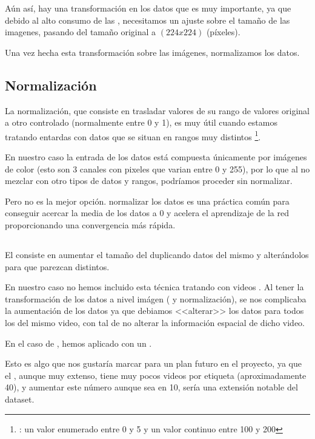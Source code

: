 Aún así, hay una transformación en los datos que es muy importante, ya que debido al alto consumo de las , necesitamos un ajuste sobre el tamaño de las imagenes, pasando del tamaño original a $(224x224)$ (píxeles).

Una vez hecha esta transformación sobre las imágenes, normalizamos los datos.

\subsection{Normalización}

La normalización, que consiste en trasladar valores de su rango de valores original a otro controlado (normalmente entre 0 y 1), es muy útil cuando estamos tratando entardas con datos que se situan en rangos muy distintos \footnote{\pe: un valor enumerado entre 0 y 5 y un valor continuo entre 100 y 200}.

En nuestro caso la entrada de los datos está compuesta únicamente por imágenes de color (esto son 3 canales con pixeles que varian entre 0 y 255), por lo que al no mezclar con otro tipos de datos y rangos, podríamos proceder sin normalizar.

Pero no es la mejor opción. normalizar los datos es una práctica común para conseguir acercar la media de los datos a 0 y acelera el aprendizaje de la red proporcionando una convergencia más rápida.

\subsection{}

El  consiste en aumentar el tamaño del  duplicando datos del mismo y alterándolos para que parezcan distintos.

En nuestro caso no hemos incluido esta técnica tratando con videos . Al tener la transformación de los datos a nivel imágen ( y normalización), se nos complicaba la aumentación de los datos ya que debiamos <<alterar>> los datos para todos los  del mismo video, con tal de no alterar la información espacial de dicho video.

En el caso de , hemos aplicado  con un .

Esto es algo que nos gustaría marcar para un plan futuro en el proyecto, ya que el , aunque muy extenso, tiene muy pocos videos por etiqueta (aproximadamente 40), y aumentar este número aunque sea en 10, sería una extensión notable del dataset.

